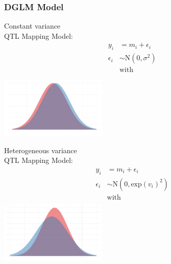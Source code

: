\documentclass{beamer}
\newcommand{\N}{\text{N}}
\begin{document}
\begin{frame}\frametitle{DGLM Model}
    \begin{minipage}{0.4\textwidth}
        Constant variance\\QTL Mapping Model:
        \begin{align*}
            y_i &= m_i + \epsilon_i\\
            \epsilon_i &\sim \text{N}(0, \sigma^2)\\
            &\text{with}\\
            \\
        \end{align*}
        \includegraphics[width = 2in]{mean_effect_two_groups}
    \end{minipage}\hfill
    \pause
    \begin{minipage}{0.4\textwidth}
        Heterogeneous variance\\ QTL Mapping Model:
        \begin{align*}
            y_i &= m_i + \epsilon_i\\%
            \epsilon_i &\sim \text{N}(0, \text{exp}(v_i)^2)\\
            &\text{with}\\
            
        \end{align*}
        \includegraphics[width = 2in]{meanvar_effect_two_groups}
    \end{minipage}
\end{frame}
\end{document}
